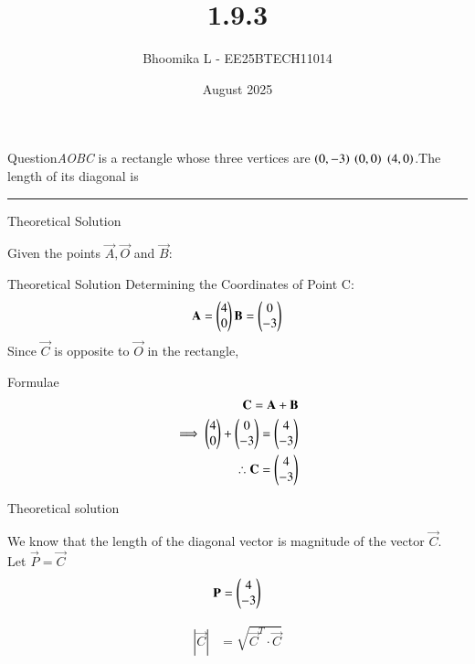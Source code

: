 \documentclass{beamer}
\title %
{1.9.3}
\date{August  2025}
\author %
{Bhoomika L - EE25BTECH11014}
\begin{document}
\frame{\titlepage}
\begin{frame}{Question}\textit{AOBC} is a rectangle whose three vertices are $\left(0,-3\right)$ $\left(0,0\right)$ $\left(4,0\right)$.The length of its diagonal is\rule{2cm}{0.4pt}
\end{frame}

\begin{frame}{Theoretical Solution}

 Given the points $\vec{A},\vec{O}$ and $\vec{B}:$\\
\begin{table}[H]    
  \centering
  
  \caption{Position Vectors of the points on rectangle.}
  \label{tab:1.9.3}
\end{table}

\end{frame}


\begin{frame}{Theoretical Solution}
Determining the Coordinates of Point C:
\begin{align}
 \mathbf{A} = \begin{pmatrix}4\\0 \end{pmatrix}
 \mathbf{B} = \begin{pmatrix}0\\-3\end{pmatrix}
\end{align}
 Since $\vec{C}$ is opposite to $\vec{O}$ in the rectangle,
\end{frame}

\begin{frame}{Formulae}
\begin{align}
\mathbf{C} = \mathbf{A} + \mathbf{B}
\\
\implies \begin{pmatrix}4\\0\end{pmatrix}+ \begin{pmatrix}0\\-3\end{pmatrix}=\begin{pmatrix}4\\-3\end{pmatrix}\\
\therefore \mathbf{C}=\begin{pmatrix}4\\-3\end{pmatrix}
\end{align}
\end{frame}

\begin{frame}{Theoretical solution}

We know that the length of the diagonal vector is magnitude of the vector $\vec{C}$.\\
Let $\vec{P}=\vec{C}$
\begin{align}
\mathbf{P}= \begin{pmatrix}4 \\ -3\end{pmatrix} 
\end{align}


\begin{align}
\left|\vec{C} \right| &= \sqrt{ \vec{C}^T \cdot \vec{C}}
 \end{align}
    
\end{frame}
\end{document}
